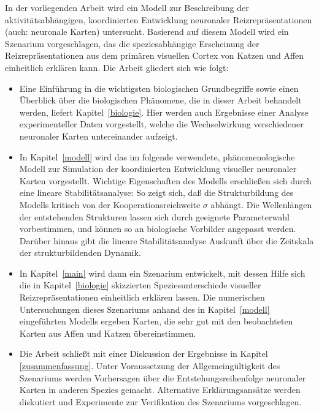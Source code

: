 In der vorliegenden Arbeit wird ein Modell zur Beschreibung der
aktivitätsabhängigen, koordinierten Entwicklung neuronaler
Reizrepräsentationen (auch: neuronale Karten) untersucht.  Basierend auf
diesem Modell wird ein Szenarium vorgeschlagen, das die speziesabhängige
Erscheinung der Reizrepräsentationen aus dem primären visuellen Cortex
von Katzen und Affen einheitlich erklären kann.  Die Arbeit gliedert sich
wie folgt:

\begin{itemize}
\item Eine Einführung in die wichtigsten biologischen Grundbegriffe sowie
einen Über\-blick über die biologischen Phänomene, die in dieser Arbeit
behandelt werden, liefert Kapitel~\ref{biologie}. Hier werden auch
Ergebnisse einer Analyse experimenteller Daten vorgestellt, welche die
Wechselwirkung verschiedener neuronaler Karten untereinander aufzeigt.

\item In Kapitel~\ref{modell} wird das im folgende verwendete,
phänomenologische Modell zur Simulation der koordinierten Entwicklung
visueller neuronaler Karten vorgestellt. Wichtige Eigenschaften des Modells
erschließen sich durch eine lineare Stabilitätsanalyse: So zeigt sich,
daß die Strukturbildung des Modells kritisch von der
Kooperationsreichweite $\sigma$ abhängt.  Die Wellenlängen der
entstehenden Strukturen lassen sich durch geeignete Parameterwahl
vorbestimmen, und können so an biologische Vorbilder angepasst werden.
Darüber hinaus gibt die lineare Stabilitätsanalyse Auskunft über die
Zeitskala der strukturbildenden Dynamik.

\item In Kapitel~\ref{main} wird dann ein Szenarium entwickelt, mit dessen
Hilfe sich die in Kapitel~\ref{biologie} skizzierten Speziesunterschiede
visueller Reizrepräsentationen einheitlich erklären lassen.  Die
numerischen Untersuchungen dieses Szenariums anhand des in
Kapitel~\ref{modell} eingeführten Modells ergeben Karten, die sehr gut mit
den beobachteten Karten aus Affen und Katzen übereinstimmen.

\item Die Arbeit schließt mit einer Diskussion der Ergebnisse in Kapitel
\ref{zusammenfassung}. Unter Voraussetzung der Allgemeingültigkeit des
Szenariums werden Vorhersagen über die Entstehungsreihenfolge neuronaler
Karten in anderen Spezies gemacht. Alternative Erklärungsansätze werden
diskutiert und Experimente zur Verifikation des Szenariums vorgeschlagen.
\end{itemize}
